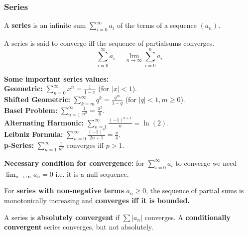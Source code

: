 \subsubsection{Series}

\begin{definition}
    A \textbf{series} is an infinite sum $\sum_{i=0}^\infty a_i$ of the terms of a sequence $(a_n)$.
\end{definition}

\begin{definition}
    A series is said to converge iff the sequence of partialsums converges.
    $$\sum_{i=0}^\infty a_i = \lim_{n \to \infty} \sum_{i=0}^n a_i$$
\end{definition}

\begin{remark}
    \textbf{Some important series values:} \\
    \textbf{Geometric:} $\sum_{n=0}^\infty x^n = \frac{1}{1-x}$ (for $|x| < 1$). \\
    \textbf{Shifted Geometric:} $\sum_{k=m}^\infty q^k = \frac{q^m}{1-q}$ (for $|q| < 1, m \ge 0$). \\
    \textbf{Basel Problem:} $\sum_{n=1}^\infty \frac{1}{n^2} = \frac{\pi^2}{6}$. \\
    \textbf{Alternating Harmonic:} $\sum_{n=1}^\infty \frac{(-1)^{n+1}}{n} = \ln(2)$. \\
    \textbf{Leibniz Formula:} $\sum_{n=0}^\infty \frac{(-1)^n}{2n+1} = \frac{\pi}{4}$. \\
    \textbf{p-Series:} $\sum_{n=1}^\infty \frac{1}{n^p}$ converges iff $p > 1$.
\end{remark}

\begin{theorem}
    \textbf{Necessary condition for convergence:} for $\sum_{i=0}^\infty a_i$ to converge we need $\lim_{n \to \infty} a_n = 0$ i.e. it is a null sequence.
\end{theorem}

\begin{theorem}
    For \textbf{series with non-negative terms} $a_n \ge 0$, the sequence of partial sums is monotonically increasing and \textbf{converges iff it is bounded.}
\end{theorem}

\begin{definition}
    A series is \textbf{absolutely convergent} if $\sum |a_n|$ converges. A \textbf{conditionally convergent} series converges, but not absolutely.
\end{definition}

